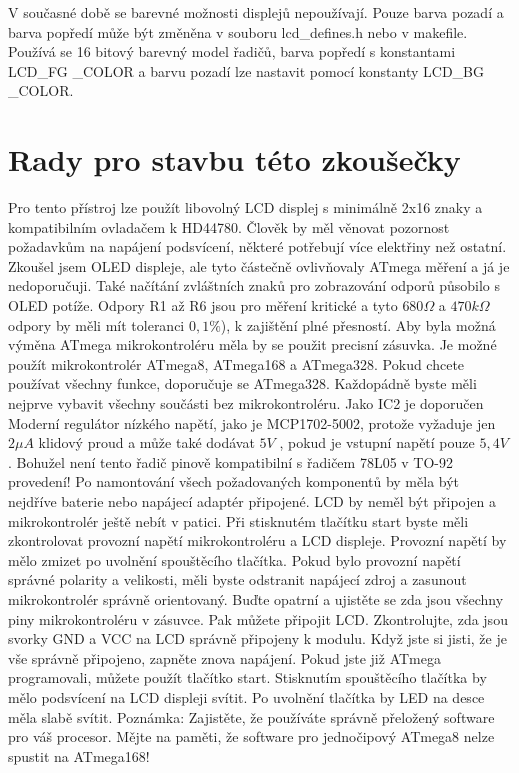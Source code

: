 V současné době se barevné možnosti displejů nepoužívají. Pouze barva pozadí
a barva popředí může být změněna v souboru lcd\_defines.h nebo v makefile.
Používá se 16 bitový barevný model řadičů, barva popředí s konstantami
LCD\_FG \_COLOR a barvu pozadí lze nastavit pomocí konstanty LCD\_BG \_COLOR.

\section{Rady pro stavbu této zkoušečky}

Pro tento přístroj lze použít libovolný LCD displej s minimálně 2x16 znaky a kompatibilním
ovladačem k HD44780.
Člověk by měl věnovat pozornost požadavkům na napájení podsvícení, některé potřebují 
více elektřiny než ostatní.
Zkoušel jsem OLED displeje, ale tyto částečně ovlivňovaly ATmega měření
a já je nedoporučuji. Také načítání zvláštních znaků pro zobrazování odporů působilo
s OLED potíže.
Odpory R1 až R6 jsou pro měření kritické a tyto \(680\Omega\) a \(470k\Omega\) odpory
by měli mít toleranci \(0,1\%\)), k zajištění plné přesností.
Aby byla možná výměna ATmega mikrokontroléru měla by se použit precisní zásuvka.
Je možné použít mikrokontrolér ATmega8, ATmega168 a ATmega328.
Pokud chcete používat všechny funkce, doporučuje se ATmega328.
Každopádně byste měli nejprve vybavit všechny součásti bez mikrokontroléru.
Jako IC2 je doporučen Moderní regulátor nízkého napětí, jako je MCP1702-5002,
protože vyžaduje jen \(2\mu A\) klidový proud a může také dodávat \(5V\) , 
pokud je vstupní napětí pouze \(5,4V\) .
Bohužel není tento řadič pinově kompatibilní s řadičem 78L05 v TO-92 provedení!
Po namontování všech požadovaných komponentů by měla být nejdříve baterie 
nebo napájecí adaptér připojené. LCD by neměl být připojen a mikrokontrolér ještě
nebít v patici.
Při stisknutém tlačítku start byste měli zkontrolovat provozní napětí mikrokontroléru a LCD displeje.
Provozní napětí by mělo zmizet po uvolnění spouštěcího tlačítka.
Pokud bylo provozní napětí správné polarity a velikosti,
měli byste odstranit napájecí zdroj a zasunout mikrokontrolér správně orientovaný.
Buďte opatrní a ujistěte se zda jsou všechny piny mikrokontroléru v zásuvce.
Pak můžete připojit LCD. Zkontrolujte, zda jsou svorky GND a VCC na LCD správně připojeny k modulu.
Když jste si jisti, že je vše správně připojeno, zapněte znova napájení.
Pokud jste již ATmega programovali, můžete použít tlačítko start.
Stisknutím spouštěcího tlačítka by mělo podsvícení na LCD displeji svítit.
Po uvolnění tlačítka by LED na desce měla slabě svítit.
Poznámka: Zajistěte, že používáte správně přeložený software pro váš procesor.
Mějte na paměti, že software pro jednočipový ATmega8 nelze spustit na ATmega168!

